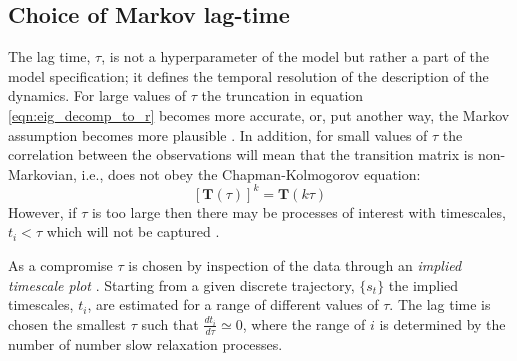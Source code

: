 \subsection{Choice of Markov lag-time}
The lag time, $\tau$, is not a hyperparameter of the model but rather a part of the model specification; it defines the temporal resolution of the description of the dynamics. For large values of $\tau$ the truncation in equation \ref{eqn:eig_decomp_to_r} becomes more accurate, or, put another way, the Markov assumption becomes more plausible \cite{prinzMarkovModelsMolecular2011}. In addition, for small values of $\tau$ the correlation between the observations will mean that the transition matrix is non-Markovian, i.e., does not obey the Chapman-Kolmogorov equation:
\begin{equation}\label{eqn:ck_eqn}
[\mathbf{T}(\tau)]^{k} = \mathbf{T}(k \tau)
\end{equation}
However, if $\tau$ is too large then there may be processes of interest with timescales, $t_{i}<\tau$ which will not be captured \cite{prinzMarkovModelsMolecular2011}.

As a compromise $\tau$ is chosen by inspection of the data through an \emph{implied timescale plot} \cite{prinzMarkovModelsMolecular2011,swopeDescribingProteinFolding2004a}. Starting from a given discrete trajectory, $\{s_{t}\}$ the implied timescales, $t_{i}$, are estimated for a range of different values of $\tau$. The lag time is chosen the smallest $\tau$ such that $\frac{d t_{i}}{d \tau} \simeq 0$, where the range of $i$ is determined by the number of number slow relaxation processes. 

